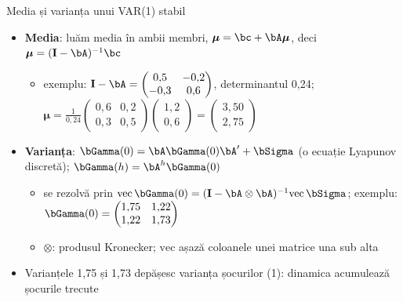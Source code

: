 \begin{frame}{Media și varianța unui VAR(1) stabil}
\itemsize{\small}
\begin{itemize}
    \item \textbf{Media}: luăm media în ambii membri, $\boldsymbol{\mu} = \bc + \bA\boldsymbol{\mu}$, deci $\boldsymbol{\mu} = (\mathbf{I} - \bA)^{-1}\bc$
    \begin{itemize}
        \item exemplu: $\mathbf{I} - \bA = \begin{pmatrix} 0{,}5 & -0{,}2 \\ -0{,}3 & 0{,}6 \end{pmatrix}$, determinantul 0{,}24; $\boldsymbol{\mu} = \frac{1}{0{,}24}\begin{pmatrix} 0{,}6 & 0{,}2 \\ 0{,}3 & 0{,}5 \end{pmatrix}\begin{pmatrix} 1{,}2 \\ 0{,}6 \end{pmatrix} = \begin{pmatrix} 3{,}50 \\ 2{,}75 \end{pmatrix}$
    \end{itemize}
    \item \textbf{Varianța}: $\bGamma(0) = \bA\bGamma(0)\bA' + \bSigma$ (o ecuație Lyapunov discretă); $\bGamma(h) = \bA^h\bGamma(0)$
    \begin{itemize}
        \item se rezolvă prin $\mathrm{vec}\,\bGamma(0) = (\mathbf{I} - \bA \otimes \bA)^{-1}\mathrm{vec}\,\bSigma$; exemplu: $\bGamma(0) = \begin{pmatrix} 1{,}75 & 1{,}22 \\ 1{,}22 & 1{,}73 \end{pmatrix}$
        \item $\otimes$: produsul Kronecker; $\mathrm{vec}$ așază coloanele unei matrice una sub alta
    \end{itemize}
    \item Varianțele 1{,}75 și 1{,}73 depășesc varianța șocurilor (1): dinamica acumulează șocurile trecute
\end{itemize}
\end{frame}

